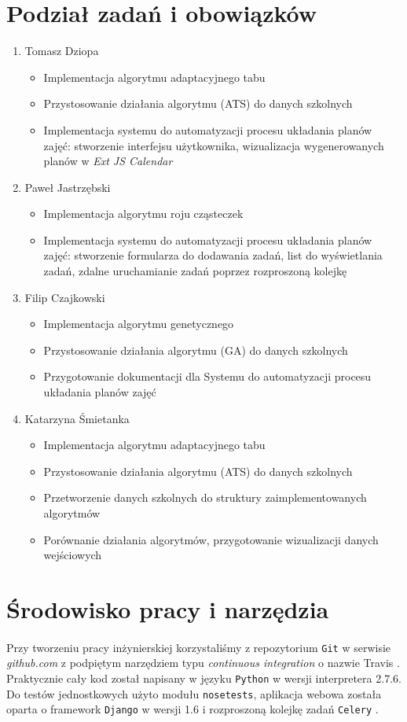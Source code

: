 \section{Podział zadań i obowiązków}
\begin{enumerate}
\item Tomasz Dziopa 
\begin{itemize}
\item Implementacja algorytmu adaptacyjnego tabu
\item Przystosowanie działania algorytmu (ATS) do danych szkolnych
\item Implementacja systemu do automatyzacji procesu układania planów zajęć: stworzenie interfejsu użytkownika, wizualizacja wygenerowanych planów w \emph{Ext JS Calendar}
\end{itemize}
\item Paweł Jastrzębski
\begin{itemize}
\item Implementacja algorytmu roju cząsteczek
\item Implementacja systemu do automatyzacji procesu układania planów zajęć: stworzenie formularza do dodawania zadań, list do wyświetlania zadań, zdalne uruchamianie zadań poprzez rozproszoną kolejkę 
\end{itemize}
\item Filip Czajkowski
\begin{itemize}
\item Implementacja algorytmu genetycznego
\item Przystosowanie działania algorytmu (GA) do danych szkolnych
\item Przygotowanie dokumentacji dla Systemu do automatyzacji procesu układania planów zajęć
\end{itemize}
\item Katarzyna Śmietanka
\begin{itemize}
\item Implementacja algorytmu adaptacyjnego tabu
\item Przystosowanie działania algorytmu (ATS) do danych szkolnych
\item Przetworzenie danych szkolnych do struktury zaimplementowanych algorytmów
\item Porównanie działania algorytmów, przygotowanie wizualizacji danych wejściowych
\end{itemize}
\end{enumerate}
\section{Środowisko pracy i narzędzia}
\paragraph{} Przy tworzeniu pracy inżynierskiej korzystaliśmy z repozytorium \verb#Git# w serwisie \emph{github.com} \cite{github} z podpiętym narzędziem typu \textit{continuous integration} o nazwie Travis \cite{travis}. Praktycznie cały kod został napisany w języku \verb#Python# w wersji interpretera 2.7.6. Do testów jednostkowych użyto modułu \verb#nosetests#, aplikacja webowa została oparta o framework \verb#Django# w wersji 1.6 i rozproszoną kolejkę zadań \verb#Celery# \cite{celery}.